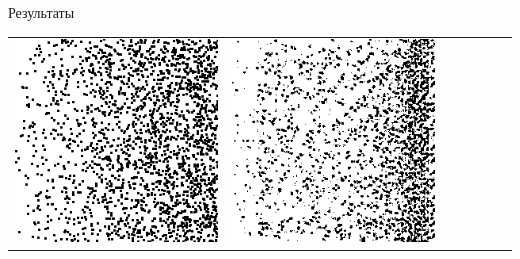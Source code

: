 \documentclass[12pt]{beamer}
\begin{document}
\begin{frame}{Результаты}
\begin{table}
\begin{center}
\begin{tabular}{p{1.2cm} p{1.2cm} p{1.2cm} p{1.2cm} p{1.2cm} p{1.2cm} p{1.2cm}}
					\includegraphics[width=1\linewidth]{8-results/sand-trend8/pan3}
					&
					\includegraphics[width=1\linewidth]{8-results/sand-trend8/nf32e5/gen3}
					&

\end{tabular}
\end{center}
\end{table}
\end{frame}
\end{document}
